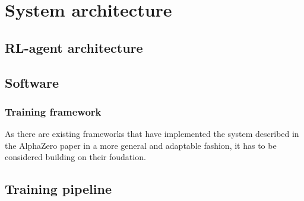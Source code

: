 \chapter{System architecture}

\section{RL-agent architecture}

\section{Software}
\subsection{Training framework}
As there are existing frameworks that have implemented the system described in the AlphaZero paper in a more general and adaptable fashion, it has to be considered building on their foudation.

\section{Training pipeline}